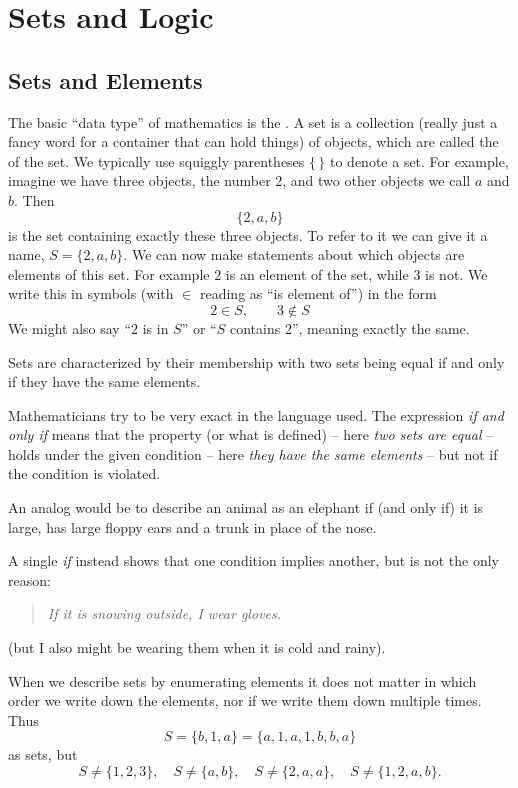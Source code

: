 \chapter{Sets and Logic}
\label{chsets}

\section{Sets and Elements}

The basic ``data type'' of mathematics is the . A set is a
collection (really just a fancy word for a container that can hold things)
of objects, which are called the  of the set. 
We typically use squiggly parentheses $\{\,\}$ to denote a set.
For example,
imagine we have three objects, the number 2, and two other objects we call
$a$ and $b$. Then 
\[
\{2,a,b\}
\]
is the set containing exactly these three objects. To refer to it we can give it
a name, $S=\{2,a,b\}$. 
We can now make statements about which objects are elements of this set. For
example $2$ is an element of the set, while $3$ is not. We write this in
symbols (with $\in$ reading as ``is element of'') in the form
\[
2\in S,\qquad 3\not\in S
\]
We might also say ``$2$ is in $S$'' or ``$S$ contains $2$'', meaning exactly
the same.

Sets are characterized by their membership with two sets being equal if and
only if they have the same elements.
\begin{note}
Mathematicians try to be very exact in the language used. The expression {\em if
and only if} means that the property (or what is defined) -- here {\em two
sets are equal} -- holds under the given condition -- here {\em they have the same
elements} -- but not if the condition is violated. 

An analog would be to describe an animal as an elephant if (and only if) it
is large, has large floppy ears and a trunk in place of the nose.
\medskip

A single {\em if} instead shows that one condition implies another, but is
not the only reason:
\begin{quote}
{\em If it is snowing outside, I wear gloves.}
\end{quote}
(but I also might be wearing them when it is cold and rainy).
\end{note}
When we describe sets
by enumerating elements it does not matter in which order we write down the
elements, nor if we write them down multiple times.
Thus
\[
S=\{b,1,a\}=\{a,1,a,1,b,b,a\}
\]
as sets, but 
\[
S\not=\{1,2,3\},\quad S\not=\{a,b\},\quad S\not=\{2,a,a\},\quad
S\not=\{1,2,a,b\}.
\]

